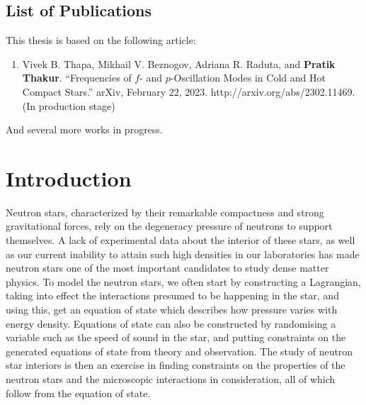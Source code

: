 \documentclass[a4paper,12pt,onehalfspacing]{report}
\newcommand\emptypage{
    \newpage
    \null
    \thispagestyle{empty}
    }
\begin{document}
\emptypage
\begin{flushright}
    \huge{\chapter*{List of Publications}}
\end{flushright}
This thesis is based on the following article: 

\begin{enumerate}
    \item Vivek B. Thapa, Mikhail V. Beznogov, Adriana R. Raduta, and \textbf{Pratik Thakur}. “Frequencies of $f$- and $p$-Oscillation Modes in Cold and Hot Compact Stars.” arXiv, February 22, 2023. http://arxiv.org/abs/2302.11469.\\ (In production stage)
\end{enumerate}

And several more works in progress.

\emptypage
\begin{flushright}
\tableofcontents
\listoffigures
\listoftables
\end{flushright}

\newpage
\emptypage
\chapter{Introduction}

Neutron stars, characterized by their remarkable compactness and strong gravitational forces, rely on the degeneracy pressure of neutrons to support themselves. A lack of experimental data about the interior of these stars, as well as our current inability to attain such high densities in our laboratories has made neutron stars one of the most important candidates to study dense matter physics. To model the neutron stars, we often start by constructing a Lagrangian, taking into effect the interactions presumed to be happening in the star, and using this, get an equation of state which describes how pressure varies with energy density. Equations of state can also be constructed by randomising a variable such as the speed of sound in the star, and putting constraints on the generated equations of state from theory and observation. The study of neutron star interiors is then an exercise in finding constraints on the properties of the neutron stars and the microscopic interactions in consideration, all of which follow from the equation of state. 
\end{document}
